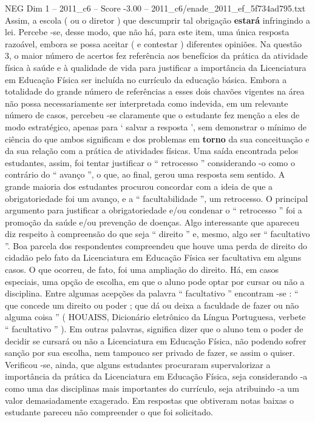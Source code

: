 \begin{textsample}{NEG Dim 1 – 2011\_c6 – Score -3.00 – 2011\_c6/enade\_2011\_ef\_5f734ad795.txt}
Assim, a escola ( ou o diretor ) que descumprir tal obrigação \textbf{estará} infringindo a lei.
Percebe -se, desse modo, que não há, para este item, uma única resposta razoável, embora se possa aceitar ( e contestar ) diferentes opiniões.
Na questão 3, o maior número de acertos fez referência aos benefícios da prática da atividade física à saúde e à qualidade de vida para justificar a importância da Licenciatura em Educação Física ser incluída no currículo da educação básica.
Embora a totalidade do grande número de referências a esses dois chavões vigentes na área não possa necessariamente ser interpretada como indevida, em um relevante número de casos, percebeu -se claramente que o estudante fez menção a eles de modo estratégico, apenas para ‘ salvar a resposta ’, sem demonstrar o mínimo de ciência do que ambos significam e dos problemas em \textbf{torno} da sua conceituação e da sua relação com a prática de atividades físicas.
Uma saída encontrada pelos estudantes, assim, foi tentar justificar o “ retrocesso ” considerando -o como o contrário do “ avanço ”, o que, ao final, gerou uma resposta sem sentido.
A grande maioria dos estudantes procurou concordar com a ideia de que a obrigatoriedade foi um avanço, e a “ facultabilidade ”, um retrocesso.
O principal argumento para justificar a obrigatoriedade e/ou condenar o “ retrocesso ” foi a promoção da saúde e/ou prevenção de doenças.
Algo interessante que apareceu diz respeito à compreensão do que seja “ direito ” e, mesmo, algo ser “ facultativo ”.
Boa parcela dos respondentes compreendeu que houve uma perda de direito do cidadão pelo fato da Licenciatura em Educação Física ser facultativa em alguns casos.
O que ocorreu, de fato, foi uma ampliação do direito.
Há, em casos especiais, uma opção de escolha, em que o aluno pode optar por cursar ou não a disciplina.
Entre algumas acepções da palavra “ facultativo ” encontram -se : “ que concede um direito ou poder ; que dá ou deixa a faculdade de fazer ou não alguma coisa ” ( HOUAISS, Dicionário eletrônico da Língua Portuguesa, verbete “ facultativo ” ).
Em outras palavras, significa dizer que o aluno tem o poder de decidir se cursará ou não a Licenciatura em Educação Física, não podendo sofrer sanção por sua escolha, nem tampouco ser privado de fazer, se assim o quiser.
Verificou -se, ainda, que alguns estudantes procuraram supervalorizar a importância da prática da Licenciatura em Educação Física, seja considerando -a como uma das disciplinas mais importantes do currículo, seja atribuindo -a um valor demasiadamente exagerado.
Em respostas que obtiveram notas baixas o estudante pareceu não compreender o que foi solicitado.

\end{textsample}
